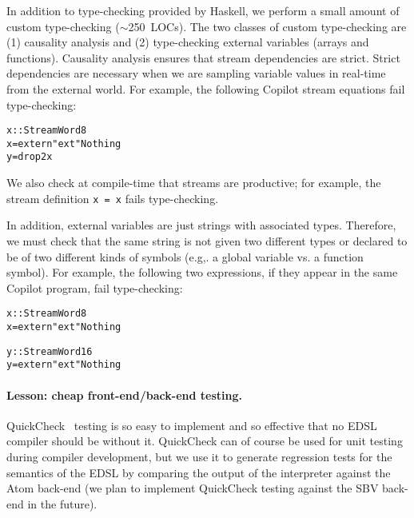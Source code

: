 \documentclass[preprint]{sigplanconf}
\newenvironment{code}{\begin{alltt}\footnotesize}{\end{alltt}}
\begin{document}

In addition to type-checking provided by Haskell, we perform a small amount of
custom type-checking ($\sim$250~LOCs).  The two classes of custom type-checking
are (1) causality analysis and (2) type-checking external variables (arrays and
functions).  Causality analysis ensures that stream dependencies are strict.
Strict dependencies are necessary when we are sampling variable values in
real-time from the external world.  For example, the following Copilot stream
equations fail type-checking:
%
\begin{code}
x :: Stream Word8
x = extern "ext" Nothing
y = drop 2 x 
\end{code}
%
We also check at compile-time that streams are productive; for example, the
stream definition {\tt x = x} fails type-checking.

In addition, external variables are just strings with associated types.
Therefore, we must check that the same string is not given two different types
or declared to be of two different kinds of symbols (e.g,. a global variable
vs. a function symbol).  For example, the following two expressions, if they
appear in the same Copilot program, fail type-checking:
%
\begin{code}
x :: Stream Word8
x = extern "ext" Nothing

y :: Stream Word16
y = extern "ext" Nothing
\end{code}



\paragraph{Lesson: cheap front-end/back-end testing.}

QuickCheck~\cite{qc} testing is so easy to implement and so effective that no
EDSL compiler should be without it.  QuickCheck can of course be used for unit
testing during compiler development, but we use it to generate regression tests
for the semantics of the EDSL by comparing the output of the interpreter against
the Atom back-end (we plan to implement QuickCheck testing against the SBV
back-end in the future).
\end{document}
